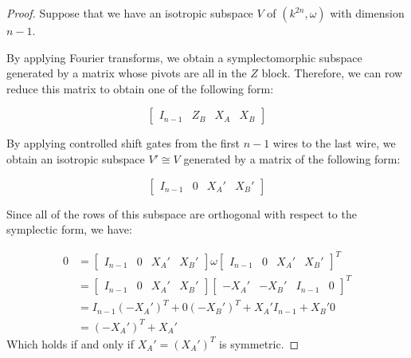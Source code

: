 \begin{proof}
Suppose that we have an isotropic subspace $V$ of $(k^{2n},\omega)$ with dimension $n-1$. 

By applying Fourier transforms, we obtain a symplectomorphic subspace generated by a matrix whose pivots are all in the $Z$ block.  Therefore, we can row reduce this matrix to obtain one of the following form:

$$
\left[\begin{array}{cc|cc}
I_{n-1} & Z_B & X_A & X_B 
\end{array}\right]
$$

By applying controlled shift gates from the first $n-1$ wires to the last wire, we obtain an isotropic subspace $V'\cong V$ generated by a matrix of the following form:


$$
\left[\begin{array}{cc|cc}
I_{n-1} & 0 & X_A' & X_B' 
\end{array}\right]
$$

Since all of the rows of this subspace are orthogonal with respect to the symplectic form, we have:

\begin{align*}
0 &=
\left[\begin{array}{cc|cc}
I_{n-1} & 0 & X_A' & X_B' 
\end{array}\right]
\omega
\left[\begin{array}{cc|cc}
I_{n-1} & 0 & X_A' & X_B' 
\end{array}\right]^T\\
&=
\left[\begin{array}{cc|cc}
I_{n-1} & 0 & X_A' & X_B' 
\end{array}\right]
\left[\begin{array}{cc|cc}
 -X_A' & -X_B'  & I_{n-1} & 0
\end{array}\right]^T\\
&=
I_{n-1}(-X_A')^T +  0( -X_B' )^T +X_A'I_{n-1} + X_B' 0 \\
&=
(-X_A')^T +X_A'
\end{align*}
Which holds if and only if $X_A'=(X_A')^T$ is symmetric.


\end{proof}
